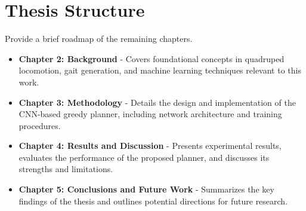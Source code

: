 \section{Thesis Structure}
\label{sec:thesis-structure}

\begin{outline}
  Provide a brief roadmap of the remaining chapters.
\end{outline}

\begin{itemize}
  \item \textbf{Chapter 2: Background} - Covers foundational concepts
    in quadruped locomotion, gait generation, and machine learning
    techniques relevant to this work.
  \item \textbf{Chapter 3: Methodology} - Details the design and
    implementation of the CNN-based greedy planner, including network
    architecture and training procedures.
  \item \textbf{Chapter 4: Results and Discussion} - Presents
    experimental results, evaluates the performance of the proposed
    planner, and discusses its strengths and limitations.
  \item \textbf{Chapter 5: Conclusions and Future Work} - Summarizes
    the key findings of the thesis and outlines potential directions
    for future research.
\end{itemize}
